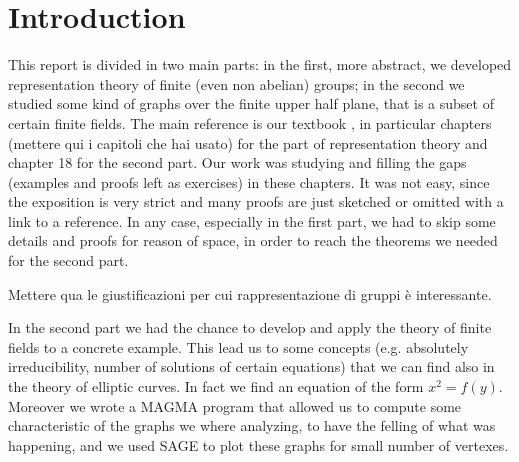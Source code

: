 \section{Introduction}
This report is divided in two main parts: in the first, more abstract, we developed representation theory of finite 
(even non abelian) groups; in the second we studied some kind of graphs over the finite upper half plane, that is a subset of
certain finite fields. The main reference is our textbook \cite{terras_1999}, in particular chapters 
(mettere qui i capitoli che hai usato) for the part of representation theory and chapter 18 for the second part.
Our work was studying and filling the gaps (examples and proofs left as exercises) in these chapters. It was not easy,
since the exposition is very strict and many proofs are just sketched or omitted with a link to a reference. In any case,
especially in the first part, we had to skip some details and proofs for reason of space, in order to reach the 
theorems we needed for the second part.

Mettere qua le giustificazioni per cui rappresentazione di gruppi è interessante.

In the second part we had the chance to develop and apply the theory of finite fields
to a concrete example. This lead us to some concepts (e.g. absolutely irreducibility, number of solutions of certain equations)
that we can find also in the theory of elliptic curves. In fact we find an equation of the form $x^2=f(y)$.
Moreover we wrote a MAGMA program that allowed us to compute some characteristic of the graphs we where analyzing, to have 
the felling of what was happening, and we used SAGE to plot these graphs for small number of vertexes.